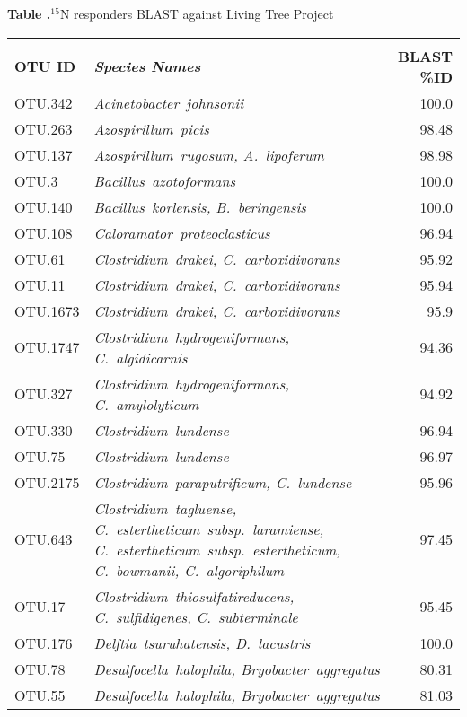 \begin{table}[H]

\textbf{\label{tab:LTP_blast} Table
.}{$^{15}$N responders BLAST against Living Tree Project}

{\tiny\begin{longtable}{l>{\itshape}p{14cm}r}
    \toprule \\
    \textbf{OTU ID} & \textbf{Species Names} & \textbf{BLAST \%ID} \\
    \midrule
OTU.342 & Acinetobacter~johnsonii & 100.0 \\ \midrule
OTU.263 & Azospirillum~picis & 98.48 \\ \midrule
OTU.137 & Azospirillum~rugosum, A.~lipoferum & 98.98 \\ \midrule
OTU.3 & Bacillus~azotoformans & 100.0 \\ \midrule
OTU.140 & Bacillus~korlensis, B.~beringensis & 100.0 \\ \midrule
OTU.108 & Caloramator~proteoclasticus & 96.94 \\ \midrule
OTU.61 & Clostridium~drakei, C.~carboxidivorans & 95.92 \\ \midrule
OTU.11 & Clostridium~drakei, C.~carboxidivorans & 95.94 \\ \midrule
OTU.1673 & Clostridium~drakei, C.~carboxidivorans & 95.9 \\ \midrule
OTU.1747 & Clostridium~hydrogeniformans, C.~algidicarnis & 94.36 \\ \midrule
OTU.327 & Clostridium~hydrogeniformans, C.~amylolyticum & 94.92 \\ \midrule
OTU.330 & Clostridium~lundense & 96.94 \\ \midrule
OTU.75 & Clostridium~lundense & 96.97 \\ \midrule
OTU.2175 & Clostridium~paraputrificum, C.~lundense & 95.96 \\ \midrule
OTU.643 & Clostridium~tagluense, C.~estertheticum~subsp.~laramiense, C.~estertheticum~subsp.~estertheticum, C.~bowmanii, C.~algoriphilum & 97.45 \\ \midrule
OTU.17 & Clostridium~thiosulfatireducens, C.~sulfidigenes, C.~subterminale & 95.45 \\ \midrule
OTU.176 & Delftia~tsuruhatensis, D.~lacustris & 100.0 \\ \midrule
OTU.78 & Desulfocella~halophila, Bryobacter~aggregatus & 80.31 \\ \midrule
OTU.55 & Desulfocella~halophila, Bryobacter~aggregatus & 81.03 \\ \midrule

\end{longtable}}
\end{table}
